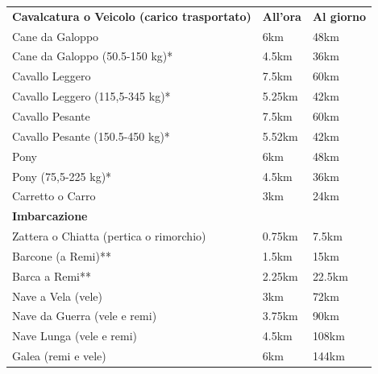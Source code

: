 \documentclass[a4paper,11pt,twoside,openany]{book}
\begin{document}
\begin{tabular}{lll}
	\toprule
	\textbf{Cavalcatura o Veicolo (carico trasportato)} & \textbf{All'ora} & \textbf{Al giorno}\tabularnewline
	Cane da Galoppo                                     & 6km              & 48km                              \\
	Cane da Galoppo (50.5-150 kg)*                      & 4.5km            & 36km                              \\
	Cavallo Leggero                                     & 7.5km            & 60km                              \\
	Cavallo Leggero (115,5-345 kg)*                     & 5.25km           & 42km                              \\
	Cavallo Pesante                                     & 7.5km            & 60km                              \\
	Cavallo Pesante (150.5-450 kg)*                     & 5.52km           & 42km                              \\
	Pony                                                & 6km              & 48km                              \\
	Pony (75,5-225 kg)*                                 & 4.5km            & 36km                              \\
	Carretto o Carro                                    & 3km              & 24km                              \\
	\textbf{Imbarcazione}                               &                  &                                   \\
	Zattera o Chiatta (pertica o rimorchio)             & 0.75km           & 7.5km                             \\
	Barcone (a Remi)**                                  & 1.5km            & 15km                              \\
	Barca a Remi**                                      & 2.25km           & 22.5km                            \\
	Nave a Vela (vele)                                  & 3km              & 72km                              \\
	Nave da Guerra (vele e remi)                        & 3.75km           & 90km                              \\
	Nave Lunga (vele e remi)                            & 4.5km            & 108km                             \\
	Galea (remi e vele)                                 & 6km              & 144km                             \\
\end{tabular}
\end{document}
